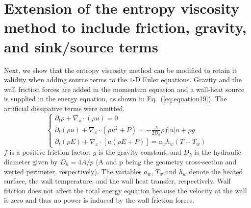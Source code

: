 \documentclass[12pt]{article}
\newcommand{\eqt}[1]{Eq.~(\ref{#1})} %
\begin{document}
%
\section{Extension of the entropy viscosity method to include friction, gravity, and sink/source terms}
\label{sec:ext}

Next, we show that the entropy viscosity method can be modified to retain it validity when adding source terms to the $1$-D Euler equations. Gravity and the wall friction forces are added in the momentum equation and a wall-heat source is supplied in the energy equation, as shown in \eqt{eq:equation19}. The artificial dissipative terms were omitted.
\begin{equation}
\label{eq:equation19}
\left\{
\begin{array}{lll}
\partial_t \rho + \nabla_x  \cdot \left( \rho u \right) = 0 \\
\partial_t \left( \rho u \right) + \nabla_x \cdot \left( \rho u^2 + P \right) =  - \frac{A}{2 D_h} \rho f |u| u + \rho g \\
\partial_t \left( \rho E \right) + \nabla_x \cdot \left[ u  \left( \rho E + P \right) \right] = a_w h_w \left( T - T_w \right)
\end{array}
\right.
\end{equation}
$f$ is a positive friction factor, $g$ is the gravity constant, and $D_h$ is the hydraulic diameter given by $D_h = 4A/p$ (A and p being the geometry cross-section and wetted perimeter, respectively). The variables $a_w$, $T_w$ and $h_w$ denote the heated surface, the wall temperature, and the wall heat transfer, respectively.
Wall friction does not affect the total energy equation because  the velocity at the wall is zero and thus no power is induced by the wall friction forces. 
\end{document}
